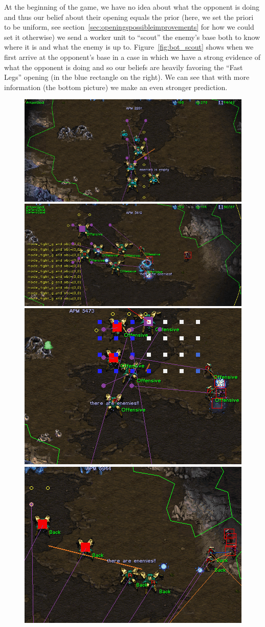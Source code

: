 At the beginning of the game, we have no idea about what the opponent is doing and thus our belief about their opening equals the prior (here, we set the priori to be uniform, see section~\ref{sec:openingspossibleimprovements} for how we could set it otherwise) we send a worker unit to ``scout'' the enemy's base both to know where it is and what the enemy is up to. Figure~\ref{fig:bot_scout} shows when we first arrive at the opponent's base in a case in which we have a strong evidence of what the opponent is doing and so our beliefs are heavily favoring the ``Fast Legs'' opening (in the blue rectangle on the right). We can see that with more information (the bottom picture) we make an even stronger prediction.

\begin{figure}[h]
\begin{center}
\includegraphics[width=0.69\columnwidth]{images/botgame/attack0.png}
\includegraphics[width=0.69\columnwidth]{images/botgame/attack1.png} 
\includegraphics[width=0.496\columnwidth]{images/botgame/attack2.png}
\includegraphics[width=0.496\columnwidth]{images/botgame/attack3.png}

\end{center}
\end{figure}
